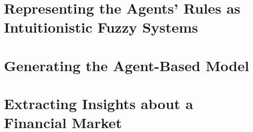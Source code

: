 \section{Representing the Agents' Rules as Intuitionistic Fuzzy Systems}
\label{section:representing-the-agents-rules-as-intuitionistic-fuzzy-systems}

\section{Generating the Agent-Based Model}
\label{section:generating-the-agent-based-model}

\section{Extracting Insights about a Financial Market}
\label{section:extracting-insights-about-a-financial-market}
